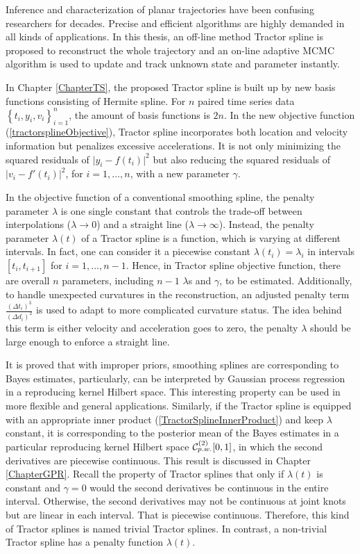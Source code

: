 
Inference and characterization of planar trajectories have been confusing researchers for decades. Precise and efficient algorithms are highly demanded in all kinds of applications. In this thesis, an off-line method Tractor spline is proposed to reconstruct the whole trajectory and an on-line adaptive MCMC algorithm is used to update and track unknown state and parameter instantly. 

In Chapter \ref{ChapterTS}, the proposed Tractor spline is built up by new basis functions consisting of Hermite spline. For $n$ paired time series data $\left\lbrace t_i,y_i,v_i\right\rbrace_{i=1}^{n}$, the amount of basis functions is $2n$. In the new objective function (\ref{tractorsplineObjective}), Tractor spline incorporates both location and velocity information but penalizes excessive accelerations. It is not only minimizing the squared residuals of $\lvert y_i-f(t_i)\rvert^2$ but also reducing the squared residuals of $\lvert v_i-f'(t_i)\rvert^2$, for $i=1,\ldots,n$, with a new parameter $\gamma$. 

In the objective function of a conventional smoothing spline, the penalty parameter $\lambda$ is one single constant that controls the trade-off between interpolations ($\lambda\to 0$) and a straight line ($\lambda\to \infty$). Instead, the penalty parameter $\lambda(t)$ of a Tractor spline is a function, which is varying at different intervals. In fact, one can consider it a piecewise constant $\lambda(t_i)=\lambda_i$ in intervals $[t_i,t_{i+1}]$ for $i=1,\ldots,n-1$. Hence, in Tractor spline objective function, there are overall $n$ parameters, including $n-1$ $\lambda$s and $\gamma$, to be estimated. Additionally, to handle unexpected curvatures in the reconstruction, an adjusted penalty term $\frac{(\Delta t_i)^3}{(\Delta d_i)^2}$ is used to adapt to more complicated curvature status. The idea behind this term is either velocity and acceleration goes to zero, the penalty $\lambda$ should be large enough to enforce a straight line. 

It is proved that with improper priors, smoothing splines are corresponding to Bayes estimates, particularly, can be interpreted by Gaussian process regression in a reproducing kernel Hilbert space. This interesting property can be used in more flexible and general applications. Similarly, if the Tractor spline is equipped with an appropriate inner product (\ref{TractorSplineInnerProduct}) and keep $\lambda$ constant, it is corresponding to the posterior mean of the Bayes estimates in a particular reproducing kernel Hilbert space $\mathcal{C}_{\footnotesize p.w.}^{(2)}[0,1]$, in which the second derivatives are piecewise continuous. This result is discussed in Chapter \ref{ChapterGPR}. Recall the property of Tractor splines that only if $\lambda(t)$ is constant and $\gamma=0$ would the second derivatives be continuous in the entire interval. Otherwise, the second derivatives may not be continuous at joint knots but are linear in each interval. That is piecewise continuous. Therefore, this kind of Tractor splines is named trivial Tractor splines. In contrast, a non-trivial Tractor spline has a penalty function $\lambda(t)$. 

